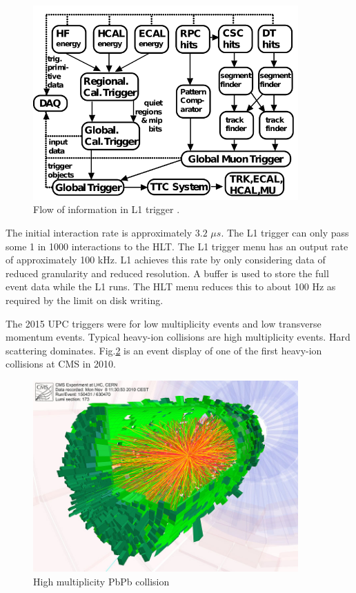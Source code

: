 \begin{figure}[h!]
\begin{centering}
\includegraphics[width=4in]{Chapter5/importfigs/l1_trigger_flow.png}
\par\end{centering}
\caption{Flow of information in L1 trigger \cite{Khachatryan:2016bia}. \label{fig:l1TriggerFlow}}
\end{figure}

The initial interaction rate is approximately $3.2$ $\mu s$. The L1 trigger can only pass some 1 in 1000 interactions to the HLT. The L1 trigger menu has an output rate of approximately 100 kHz. L1 achieves this rate by only considering data of reduced granularity and reduced resolution. A buffer is used to store the full event data while the L1 runs. The HLT menu reduces this to about 100 Hz as required by the limit on disk writing.

The 2015 UPC triggers were for low multiplicity events and low transverse momentum events. Typical heavy-ion collisions are high multiplicity events. Hard scattering dominates. Fig.\ref{fig:eventdisplayHI} is an event display of one of the first heavy-ion collisions at CMS in 2010.

\begin{figure}[h!]
\begin{centering}
\includegraphics[width=4in]{Chapter3/importfigs/cms_firstleadcoll.jpg}
\par\end{centering}
\caption{High multiplicity PbPb collision \label{fig:eventdisplayHI}}
\end{figure}

